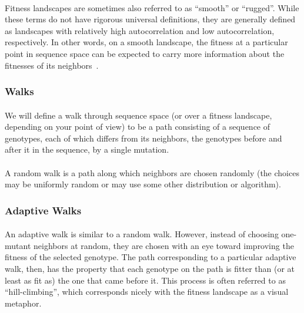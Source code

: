 \documentclass[12pt,letterpaper,titlepage]{article}
\begin{document}
\paragraph{}
Fitness landscapes are sometimes also referred to as ``smooth'' or ``rugged''.
While these terms do not have rigorous universal definitions, they are
generally defined as landscapes with relatively high autocorrelation and low
autocorrelation, respectively. In other words, on a smooth landscape, the
fitness at a particular point in sequence space can be expected to carry more
information about the fitnesses of its neighbors~\cite{Kauffman1993}.

\subsubsection{Walks}

\paragraph{}
We will define a walk through sequence space (or over a fitness landscape,
depending on your point of view) to be a path consisting of a sequence of
genotypes, each of which differs from its neighbors, the genotypes before and
after it in the sequence, by a single mutation.

\paragraph{}
A random walk is a path along which neighbors are chosen randomly (the choices
may be uniformly random or may use some other distribution or algorithm).

\subsubsection{Adaptive Walks}

\paragraph{}
An adaptive walk is similar to a random walk. However, instead of choosing
one-mutant neighbors at random, they are chosen with an eye toward improving
the fitness of the selected genotype. The path corresponding to a particular
adaptive walk, then, has the property that each genotype on the path is fitter
than (or at least as fit as) the one that came before it. This process is often
referred to as ``hill-climbing'', which corresponds nicely with the fitness
landscape as a visual metaphor.
\end{document}
